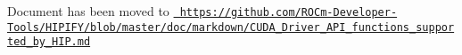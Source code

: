 Document has been moved to \href{https://github.com/ROCm-Developer-Tools/HIPIFY/blob/master/doc/markdown/CUDA_Driver_API_functions_supported_by_HIP.md}{\texttt{ https\+://github.\+com/\+ROCm-\/\+Developer-\/\+Tools/\+HIPIFY/blob/master/doc/markdown/\+CUDA\+\_\+\+Driver\+\_\+\+API\+\_\+functions\+\_\+supported\+\_\+by\+\_\+\+HIP.\+md}} 